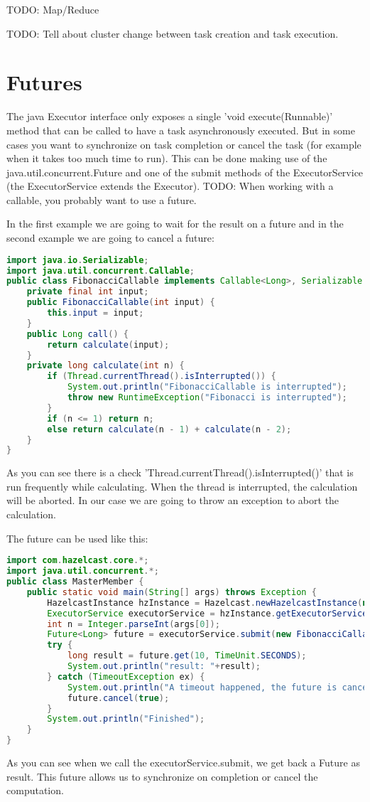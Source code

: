 TODO: Map/Reduce

TODO: Tell about cluster change between task creation and task execution.

\section{Futures}
The java Executor interface only exposes a single 'void execute(Runnable)' method that can be called to have a task asynchronously executed. But in some cases you want to synchronize on task completion or cancel the task (for example when it takes too much time to run). This can be done making use of the java.util.concurrent.Future and one of the submit methods of the ExecutorService (the ExecutorService extends the Executor). TODO: When working with a callable, you probably want to use a future.

In the first example we are going to wait for the result on a future and in the second example we are going to cancel a future:
\begin{lstlisting}[language=java]
import java.io.Serializable;
import java.util.concurrent.Callable;
public class FibonacciCallable implements Callable<Long>, Serializable {
    private final int input;
    public FibonacciCallable(int input) {
        this.input = input;
    }
    public Long call() {
        return calculate(input);
    }
    private long calculate(int n) {
        if (Thread.currentThread().isInterrupted()) {
            System.out.println("FibonacciCallable is interrupted");
            throw new RuntimeException("Fibonacci is interrupted");
        }
        if (n <= 1) return n;
        else return calculate(n - 1) + calculate(n - 2);
    }
}
\end{lstlisting}
As you can see there is a check 'Thread.currentThread().isInterrupted()' that is run frequently while calculating. When the thread is interrupted, the calculation will be aborted. In our case we are going to throw an exception to abort the calculation. 

The future can be used like this:
\begin{lstlisting}[language=java]
import com.hazelcast.core.*;
import java.util.concurrent.*;
public class MasterMember {
    public static void main(String[] args) throws Exception {
        HazelcastInstance hzInstance = Hazelcast.newHazelcastInstance(null);
        ExecutorService executorService = hzInstance.getExecutorService();
        int n = Integer.parseInt(args[0]);
        Future<Long> future = executorService.submit(new FibonacciCallable(n));
        try {
            long result = future.get(10, TimeUnit.SECONDS);
            System.out.println("result: "+result);
        } catch (TimeoutException ex) {
            System.out.println("A timeout happened, the future is cancelled");
            future.cancel(true);
        }
        System.out.println("Finished");
    }
}
\end{lstlisting}
As you can see when we call the executorService.submit, we get back a Future as result. This future allows us to synchronize on completion or cancel the computation. 


